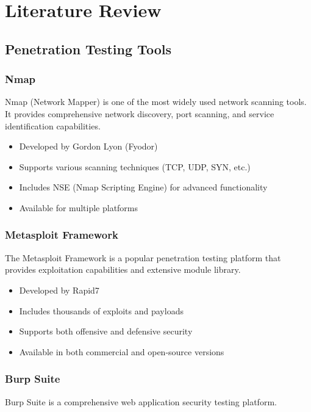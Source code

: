 \documentclass[12pt,a4paper]{report}
\begin{document}
\chapter{Literature Review}

\section{Penetration Testing Tools}

\subsection{Nmap}

Nmap (Network Mapper) is one of the most widely used network scanning tools. It provides comprehensive network discovery, port scanning, and service identification capabilities.

\begin{itemize}
    \item Developed by Gordon Lyon (Fyodor)
    \item Supports various scanning techniques (TCP, UDP, SYN, etc.)
    \item Includes NSE (Nmap Scripting Engine) for advanced functionality
    \item Available for multiple platforms
\end{itemize}

\subsection{Metasploit Framework}

The Metasploit Framework is a popular penetration testing platform that provides exploitation capabilities and extensive module library.

\begin{itemize}
    \item Developed by Rapid7
    \item Includes thousands of exploits and payloads
    \item Supports both offensive and defensive security
    \item Available in both commercial and open-source versions
\end{itemize}

\subsection{Burp Suite}

Burp Suite is a comprehensive web application security testing platform.
\end{document}
